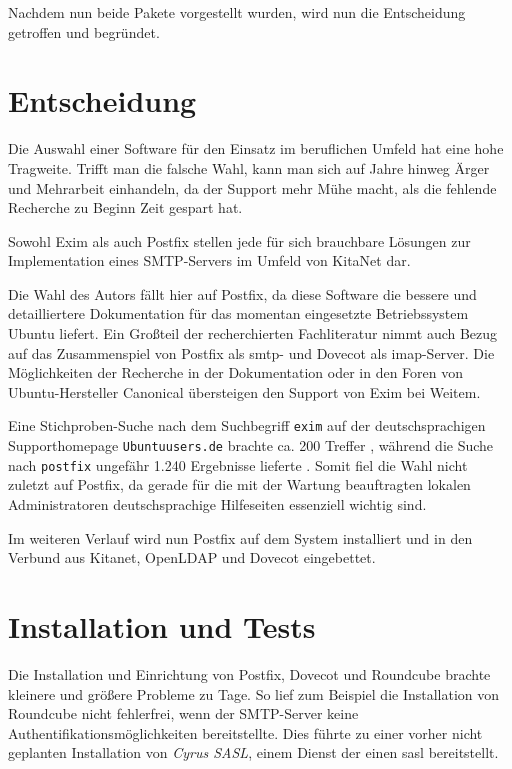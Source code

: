 Nachdem nun beide Pakete vorgestellt wurden, wird nun die Entscheidung getroffen und begründet.

\chapter{Entscheidung}
\label{sec:Entscheidung}

Die Auswahl einer Software für den Einsatz im beruflichen Umfeld hat eine hohe Tragweite. Trifft man die falsche Wahl, kann man sich auf Jahre hinweg Ärger und Mehrarbeit einhandeln, da der Support mehr Mühe macht, als die fehlende Recherche zu Beginn Zeit gespart hat.

Sowohl Exim als auch Postfix stellen jede für sich brauchbare Lösungen zur Implementation eines SMTP-Servers im Umfeld von KitaNet dar. 

Die Wahl des Autors fällt hier auf Postfix, da diese Software die bessere und detailliertere Dokumentation für das momentan eingesetzte Betriebssystem Ubuntu liefert. Ein Großteil der recherchierten Fachliteratur nimmt auch Bezug auf das Zusammenspiel von Postfix als \ac{smtp}- und Dovecot als \ac{imap}-Server.
Die Möglichkeiten der Recherche in der Dokumentation oder in den Foren von Ubuntu-Hersteller Canonical übersteigen den Support von Exim bei Weitem.

Eine Stichproben-Suche nach dem Suchbegriff \verb+exim+ auf der deutschsprachigen Supporthomepage \verb+Ubuntuusers.de+ brachte ca. 200 Treffer \citep[vgl.][]{googleexim}, während die Suche nach \verb+postfix+ ungefähr 1.240 Ergebnisse lieferte \citep[vgl.][]{googlepostfix}.
Somit fiel die Wahl nicht zuletzt auf Postfix, da gerade für die mit der Wartung beauftragten lokalen Administratoren deutschsprachige Hilfeseiten essenziell wichtig sind.

Im weiteren Verlauf wird nun Postfix auf dem System installiert und in den Verbund aus Kitanet, OpenLDAP und Dovecot eingebettet.

\chapter{Installation und Tests}

Die Installation und Einrichtung von Postfix, Dovecot und Roundcube brachte kleinere und größere Probleme zu Tage. 
So lief zum Beispiel die Installation von Roundcube nicht fehlerfrei, wenn der SMTP-Server keine Authentifikationsmöglichkeiten \citep[vgl. hierzu][]{rfc5248} bereitstellte. 
Dies führte zu einer vorher nicht geplanten Installation von \textit{Cyrus SASL}, einem Dienst der einen \ac{sasl} bereitstellt. 


